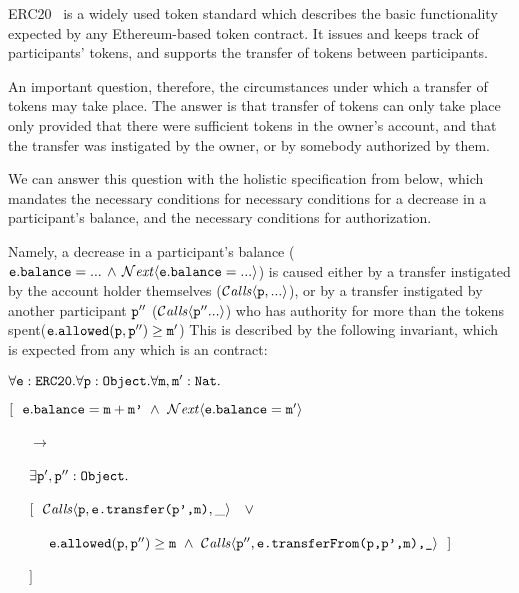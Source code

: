  
 ERC20~\cite{ERC20} is a widely used token standard which describes the 
 basic functionality expected by any    Ethereum-based token contract. 
 It issues and keeps track of participants' tokens, and supports the  transfer
 of tokens between participants. 


An important question, therefore, the circumstances under which a transfer of tokens may take place.
The answer is that transfer of tokens 
 can only take place only provided that  there were sufficient tokens in the
 owner's account, and that
 the transfer was instigated by the owner, or by somebody authorized by them.
 
We can answer this question with the holistic specification from below, which mandates 
the necessary conditions for necessary conditions for a 
 decrease in  a participant's balance, and the necessary conditions for authorization.

Namely, a decrease in  a participant's balance 
(\ie  ${\mbox{\tt{e}}}.{\mbox{\tt{balance}}}=...\, \wedge\, {\mathcal{N}}\textrm{\textit{ext}}\langle {\mbox{\tt{e}}}.{\mbox{\tt{balance}}}=...\rangle$)
is caused either by a transfer instigated by the 
account holder themselves (\ie ${\mathcal{C}}\textrm{\textit{alls}}\langle {\mbox{\tt{p}}}, ...\rangle$), or by
a transfer instigated by another participant ${\mbox{\tt{p}}}''$  (\ie ${\mathcal{C}}\textrm{\textit{alls}}\langle {\mbox{\tt{p}}}''...\rangle$) who 
has authority for more than the tokens spent(\ie  ${\mbox{\tt{e}}}.{\mbox{\tt{allowed}}}({\mbox{\tt{p}}},{\mbox{\tt{p}}}'')\geq {\mbox{\tt{m}}}'$)
This is described by the following invariant, which
is expected from any  which is an   contract:

\vspace{.15cm}
\noindent
$\forall {\mbox{\tt{e}}}:{\mbox{\tt{ERC20}}}.\forall {\mbox{\tt{p}}}:{\mbox{\tt{Object}}}.\forall {\mbox{\tt{m}}},{\mbox{\tt{m}}}':{\mbox{\tt{Nat}}}.$\\
\strut \hspace{0.3cm} $[\ \ \prg{e}.\prg{balance}=\prg{m}+\prg{m'}\ \wedge \ \Next{\prg{e}.\prg{balance}=\prg{m}'}$ \\ %
\strut \hspace{0.4cm} \ \ \ $\longrightarrow$\\
\strut \hspace{0.4cm} \ \ \ $\exists {\mbox{\tt{p}}}',{\mbox{\tt{p}}}'':{\mbox{\tt{Object}}}.$ \\
\strut \hspace{0.4cm} \ \ \  $[\ \  \Calls{\prg{p},\prg{e.transfer(p',m)},\_} \  \  \ \vee\, $\\
\strut \hspace{0.4cm} \ \ \   $\ \ \ \ \prg{e}.\prg{allowed}(\prg{p},\prg{p}'')\geq \prg{m} \ \wedge \ \Calls{\prg{p}'',\prg{e.transferFrom(p,p',m),\_}}\       \  ]$\\
\strut \hspace{0.3cm} \ \ \ $] $
\vspace{.15cm}

